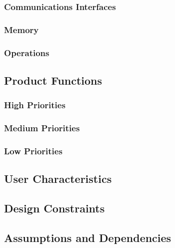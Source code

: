 \documentclass[ProjectRequirements.tex]{subfiles}
\begin{document}
		
		\subsubsection{Communications Interfaces}
		
		\subsubsection{Memory}
		
		\subsubsection{Operations}
		
	\subsection{Product Functions}
	
		\subsubsection{High Priorities}
		
		\subsubsection{Medium Priorities}
		
		\subsubsection{Low Priorities}
		
	\subsection{User Characteristics}
	
	\subsection{Design Constraints}
	
	\subsection{Assumptions and Dependencies}
	
\end{document}
